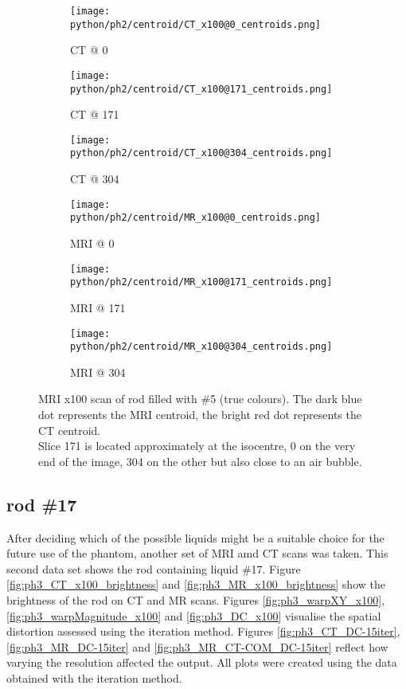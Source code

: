 \begin{figure}[!tbp]
  \begin{subfigure}[b]{0.32\textwidth}
    \texttt{[image: python/ph2/centroid/CT\_x100@0\_centroids.png]}
    \caption{CT @ 0}
    \label{fig:CT_x100_centroids@0}
  \end{subfigure}
  \begin{subfigure}[b]{0.32\textwidth}
    \texttt{[image: python/ph2/centroid/CT\_x100@171\_centroids.png]}
    \caption{CT @ 171}
    \label{fig:CT_x100_centroids@171}
  \end{subfigure}
  \begin{subfigure}[b]{0.32\textwidth}
    \texttt{[image: python/ph2/centroid/CT\_x100@304\_centroids.png]}
    \caption{CT @ 304}
    \label{fig:CT_x100_centroids@304}
  \end{subfigure}
  \begin{subfigure}[b]{0.32\textwidth}
    \texttt{[image: python/ph2/centroid/MR\_x100@0\_centroids.png]}
    \caption{MRI @ 0}
    \label{fig:MR_x100_centroids@0}
  \end{subfigure}
  \begin{subfigure}[b]{0.32\textwidth}
    \texttt{[image: python/ph2/centroid/MR\_x100@171\_centroids.png]}
    \caption{MRI @ 171}
    \label{fig:MR_x100_centroids@171}
  \end{subfigure}
  \begin{subfigure}[b]{0.32\textwidth}
    \texttt{[image: python/ph2/centroid/MR\_x100@304\_centroids.png]}
    \caption{MRI @ 304}
    \label{fig:MR_x100_centroids@304}
  \end{subfigure}
  \caption{MRI x100 scan of rod filled with \#5 (true colours). The dark blue dot represents the MRI centroid, the bright red dot represents the CT centroid.
  			\\ Slice 171 is located approximately at the isocentre, 0 on the very end of the image, 304 on the other but also close to an air bubble.}
  \label{fig:MR_x100_centroids}
\end{figure}

\clearpage

\subsection{rod \#17}

After deciding which of the possible liquids might be a suitable choice for the future use of the phantom, another set of MRI amd CT scans was taken.
This second data set shows the rod containing liquid \#17.
Figure \ref{fig:ph3_CT_x100_brightness} and \ref{fig:ph3_MR_x100_brightness} show the brightness of the rod on CT and MR scans.
Figures \ref{fig:ph3_warpXY_x100}, \ref{fig:ph3_warpMagnitude_x100} and \ref{fig:ph3_DC_x100} visualise the spatial distortion assessed using the iteration method.
Figures \ref{fig:ph3_CT_DC-15iter},  \ref{fig:ph3_MR_DC-15iter} and \ref{fig:ph3_MR_CT-COM_DC-15iter} reflect how varying the resolution affected the output.
All plots were created using the data obtained with the iteration method.


